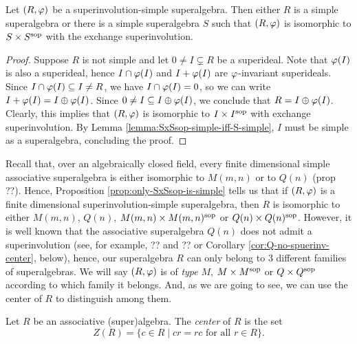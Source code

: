 \begin{prop}\label{prop:only-SxSsop-is-simple}
    Let $(R, \varphi)$ be a superinvolution-simple superalgebra.
    Then either $R$ is a simple superalgebra or there is a simple superalgebra $S$ such that $(R, \varphi)$ is isomorphic to $S\times S^{\mathrm{sop}}$ with the exchange superinvolution. 
\end{prop}

\begin{proof}
    Suppose $R$ is not simple and let $0 \neq I \subsetneq R$ be a superideal. 
    Note that $\varphi(I)$ is also a superideal, hence $I \cap \varphi(I)$ and $I + \varphi (I)$ are $\varphi$-invariant superideals. 
    Since $I \cap \varphi(I) \subseteq I \neq R$, we have $I \cap \varphi(I) = 0$, so we can write $I + \varphi (I) = I \oplus \varphi (I)$. 
    Since $0 \neq I \subseteq I \oplus \varphi (I)$, we conclude that $R = I \oplus \varphi (I)$.
    Clearly, this implies that $(R, \varphi)$ is isomorphic to $I \times I^{\mathrm{sop}}$ with exchange superinvolution. 
    By Lemma \ref{lemma:SxSsop-simple-iff-S-simple}, $I$ must be simple as a superalgebra, concluding the proof.
\end{proof}

Recall that, over an algebraically closed field, every finite dimensional simple associative superalgebra is either isomorphic to $M(m,n)$ or to $Q(n)$ (prop ??). 
Hence, Proposition \ref{prop:only-SxSsop-is-simple} tells us that if $(R, \varphi)$ is a  finite dimensional superinvolution-simple superalgebra, then $R$ is isomorphic to either $M(m,n)$, $Q(n)$, $M(m,n) \times M(m,n)^{\mathrm{sop}}$ or $Q(n) \times Q(n)^{\mathrm{sop}}$.
However, it is well known that the associative superalgebra $Q(n)$ does not admit a superinvolution (see, for example, ?? and ?? or Corollary \ref{cor:Q-no-spuerinv-center}, below),
hence, our superalgebra $R$ can only belong to 3 different families of superalgebras. 
We will say $(R,\varphi)$ is of \emph{type} $M$, $M\times M^{\mathrm{sop}}$ or $Q\times Q^{\mathrm{sop}}$ according to which family it belongs. 
And, as we are going to see, we can use the center of $R$ to distinguish among them.

\begin{defi}
    Let $R$ be an associative (super)algebra.
    The \emph{center} of $R$ is the set 
    \[
        Z(R) = \{c\in R \mid cr = rc \text{ for all } r\in R \}.
    \]
\end{defi}

